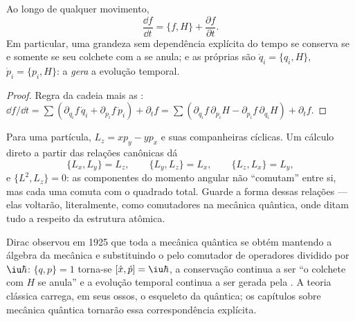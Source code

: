\begin{theorem}\label{thm:b3:hamiltonian-mechanics:evolution}
Ao longo de qualquer movimento,
\[
\frac{\dd f}{\dd t} = \{f, H\} + \frac{\partial f}{\partial t} .
\]
Em particular, uma grandeza sem dependência explícita do tempo se
conserva se e somente se seu colchete com a  se anula; e as
próprias  são $\dot q_i = \{q_i, H\}$, $\dot p_i
= \{p_i, H\}$: a  \emph{gera} a evolução temporal.
\end{theorem}

\begin{proof}
Regra da cadeia mais as : $\dd f/\dd t = \sum(
\partial_{q_i}f\,\dot q_i + \partial_{p_i}f\,\dot p_i) + \partial_tf =
\sum(\partial_{q_i}f\,\partial_{p_i}H - \partial_{p_i}f\,
\partial_{q_i}H) + \partial_tf$.
\end{proof}

\begin{example}\label{ex:b3:hamiltonian-mechanics:brackets}
Para uma partícula, $L_z = xp_y - yp_x$ e suas companheiras cíclicas.
Um cálculo direto a partir das relações canônicas dá
\[
\{L_x, L_y\} = L_z , \qquad
\{L_y, L_z\} = L_x , \qquad
\{L_z, L_x\} = L_y ,
\]
e $\{L^2, L_z\} = 0$: as componentes do momento angular não
``comutam'' entre si, mas cada uma comuta com o quadrado total. Guarde
a forma dessas relações --- elas voltarão, literalmente, como
comutadores na mecânica quântica, onde ditam tudo a respeito da
estrutura atômica.
\end{example}

\begin{remark}\label{rem:b3:hamiltonian-mechanics:doorway}
Dirac observou em 1925 que toda a mecânica quântica se obtém mantendo a
álgebra da mecânica  e substituindo o 
pelo comutador de operadores dividido por
$\iu\hbar$: $\{q, p\} = 1$ torna-se $[\hat x, \hat p] = \iu\hbar$, a
conservação continua a ser ``o colchete com $H$ se anula'' e a evolução
temporal continua a ser gerada pela . A teoria clássica
carrega, em seus ossos, o esqueleto da quântica; os capítulos sobre
mecânica quântica tornarão essa correspondência explícita.
\end{remark}

